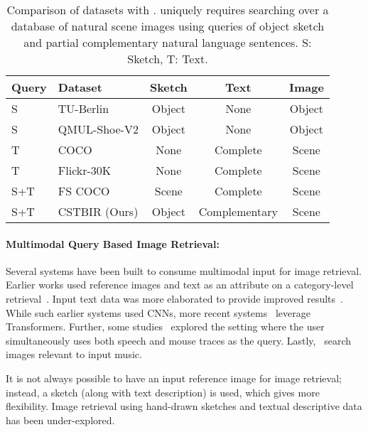 \begin{table}[!t]
\small
    \centering
    \begin{tabular}{|l|l|c|c|c|}
    \hline
     Query&Dataset&Sketch&Text&Image\\
      \hline
      \hline
S& TU-Berlin&Object&None&Object\\
S&QMUL-Shoe-V2&Object&None&Object\\
T&COCO&None&Complete&Scene\\
T&Flickr-30K&None&Complete&Scene\\
S+T&FS COCO&Scene&Complete&Scene\\
S+T&CSTBIR (Ours)&Object&Complementary&Scene\\
\hline
    \end{tabular}
    \caption{Comparison of datasets with \data{}. \data{} uniquely requires searching over a database of natural scene images using queries of object sketch and partial complementary natural language sentences. S: Sketch, T: Text.}
    \label{tab:datasetComparison}
\end{table}

\paragraph{Multimodal Query Based Image Retrieval:}
Several systems have been built to consume multimodal input for image retrieval. 
Earlier works used reference images and text as an attribute on a category-level retrieval~\cite{kovashka2012whittlesearch,han2017automatic}. Input text data was more elaborated to provide improved results~\cite{guo2018dialog,vo2019composing}. While such earlier systems used CNNs, more recent systems~\cite{song2023boosting,baldrati2022effective} leverage Transformers. Further, some studies~\cite{changpinyo2021telling,pont2020connecting} explored the setting where the user simultaneously uses both speech and mouse traces as the query. Lastly,~\cite{nakatsuka2023content} search images relevant to input music.

It is not always possible to have an input reference image for image retrieval; instead, a sketch (along with text description) is used, which gives more flexibility. Image retrieval using hand-drawn sketches and textual descriptive data has been under-explored.

